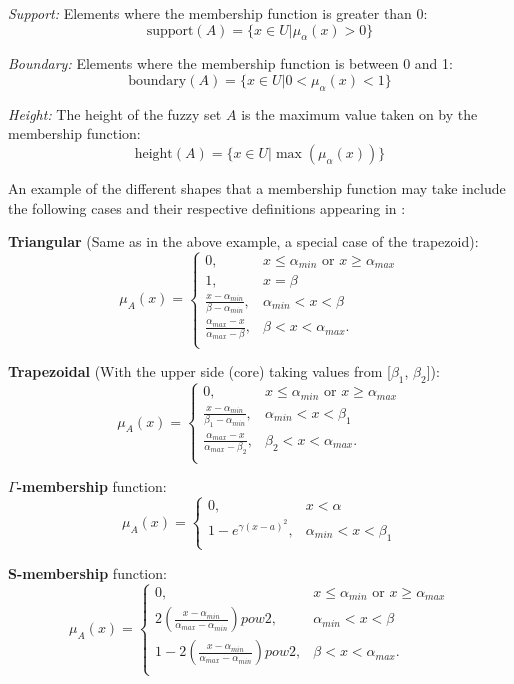 \textit{Support:} Elements where the membership function is greater than 0:
\[
	\text{support}(A) = \{x \in U \vert \mu_{\alpha}(x) > 0\}
\]

\textit{Boundary:} Elements where the membership function is between 0 and 1:
\[
	\text{boundary}(A) = \{x \in U \vert 0 < \mu_{\alpha}(x) < 1\}
\]

\textit{Height:} The height of the fuzzy set $A$ is the maximum value taken on by the membership function:
\[
	\text{height}(A) = \{x \in U \vert \max(\mu_{\alpha}(x))\}
\]

An example of the different shapes that a membership function may take include the following cases and their respective definitions appearing in \cite{sabri2013}:

\textbf{Triangular} (Same as in the above example, a special case of the trapezoid):
\[
	\mu_{A}(x) =
		\begin{cases}
			0, &x \leq \alpha_{min} \text{ or } x \geq \alpha_{max}\\
			1, &x = \beta\\
			\frac{x - \alpha_{min}}{\beta - \alpha_{min}}, &\alpha_{min} < x < \beta\\
			\frac{\alpha_{max} - x}{\alpha_{max} - \beta}, &\beta < x < \alpha_{max}.\\
		\end{cases}
\]

\textbf{Trapezoidal} (With the upper side (core) taking values from [$\beta_1$, $\beta_2$]):
\[
	\mu_{A}(x) =
		\begin{cases}
			0, &x \leq \alpha_{min} \text{ or } x \geq \alpha_{max}\\
			\frac{x - \alpha_{min}}{\beta_1 - \alpha_{min}}, &\alpha_{min} < x < \beta_1\\
			\frac{\alpha_{max} - x}{\alpha_{max} - \beta_2}, &\beta_2 < x < \alpha_{max}.\\
		\end{cases}
\]

\textbf{$\Gamma$-membership} function:
\[
	\mu_{A}(x) =
		\begin{cases}
			0, &x < \alpha\\
			1-e^{\gamma(x-a)^2}, &\alpha_{min} < x < \beta_1\\
		\end{cases}
\]

\textbf{S-membership} function:
\[
	\mu_{A}(x) =
		\begin{cases}
			0, &x \leq \alpha_{min} \text{ or } x \geq \alpha_{max}\\
			2 \left( \frac{x - \alpha_{min}}{\alpha_{max} - \alpha_{min}} \right) pow2, &\alpha_{min} < x < \beta\\
			1 - 2 \left( \frac{x - \alpha_{min}}{\alpha_{max} - \alpha_{min}} \right) pow2, &\beta < x < \alpha_{max}.\\
		\end{cases}
\]

